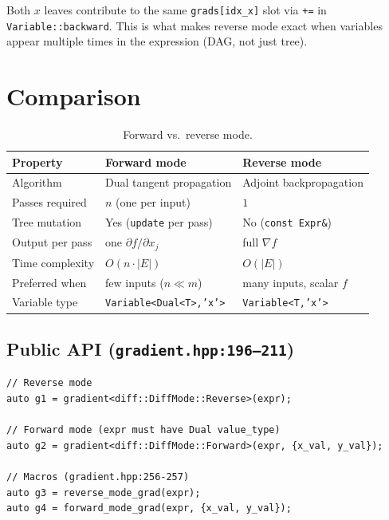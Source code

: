 \documentclass[11pt,a4paper]{article}
\newcommand{\code}[1]{\texttt{#1}}
\begin{document}
\noindent Both $x$ leaves contribute to the same \code{grads[idx\_x]} slot via
\code{+=} in \code{Variable::backward}.  This is what makes reverse mode exact
when variables appear multiple times in the expression (DAG, not just tree).

\section{Comparison}
\label{sec:comparison}

\begin{table}[h]
\centering\small
\renewcommand{\arraystretch}{1.3}
\begin{tabular}{lll}
\toprule
\textbf{Property} & \textbf{Forward mode} & \textbf{Reverse mode} \\
\midrule
Algorithm          & Dual tangent propagation    & Adjoint backpropagation \\
Passes required    & $n$ (one per input)         & $1$ \\
Tree mutation      & Yes (\code{update} per pass) & No (\code{const Expr\&}) \\
Output per pass    & one $\partial f/\partial x_j$ & full $\nabla f$ \\
Time complexity    & $O(n\cdot|E|)$              & $O(|E|)$ \\
Preferred when     & few inputs ($n \ll m$)      & many inputs, scalar $f$ \\
Variable type      & \code{Variable<Dual<T>,'x'>} & \code{Variable<T,'x'>} \\
\bottomrule
\end{tabular}
\caption{Forward vs.\ reverse mode.}
\end{table}

\subsection{Public API (\texttt{gradient.hpp:196--211})}

\begin{lstlisting}
// Reverse mode
auto g1 = gradient<diff::DiffMode::Reverse>(expr);

// Forward mode (expr must have Dual value_type)
auto g2 = gradient<diff::DiffMode::Forward>(expr, {x_val, y_val});

// Macros (gradient.hpp:256-257)
auto g3 = reverse_mode_grad(expr);
auto g4 = forward_mode_grad(expr, {x_val, y_val});
\end{lstlisting}
\end{document}
